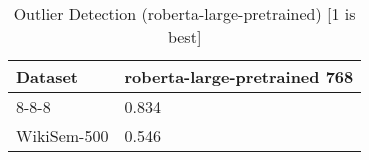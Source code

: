 \begin{table}[]
\centering
\begin{tabular}{l|l}
\hline
Dataset & roberta-large-pretrained 768 \\
\hline
8-8-8 & 0.834 \\ 
WikiSem-500 & 0.546
\end{tabular}
\caption{Outlier Detection (roberta-large-pretrained) [1 is best]}
\label{tab:outlier-roberta-large-pretrained}
\end{table}
